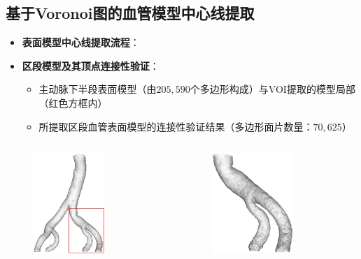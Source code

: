 \subsection[中心线提取]{基于Voronoi图的血管模型中心线提取}

\begin{frame}
\begin{itemize}
  \item \textbf{表面模型中心线提取流程}：
\end{itemize}
\begin{figure}[t]
\centering

\end{figure}
\end{frame}

\begin{frame}
\begin{itemize}
  \item \textbf{区段模型及其顶点连接性验证}：
  \begin{itemize}
    \item 主动脉下半段表面模型（由$205,590$个多边形构成）与VOI提取的模型局部（红色方框内）
    \item 所提取区段血管表面模型的连接性验证结果（多边形面片数量：$70,625$）
  \end{itemize}
\end{itemize}
\begin{columns}[b,onlytextwidth]
\begin{column}{.5\textwidth}
\begin{figure}[t]
\centering
\includegraphics[height=1.5in]{../../Figures/postprocessing/centerlines/VOI.eps}
\end{figure}
\end{column}
\begin{column}{.5\textwidth}
\begin{figure}[t]
\centering
\includegraphics[height=1.5in]{../../Figures/postprocessing/centerlines/connectivity_local.eps}
\end{figure}
\end{column}
\end{columns}
\end{frame}

